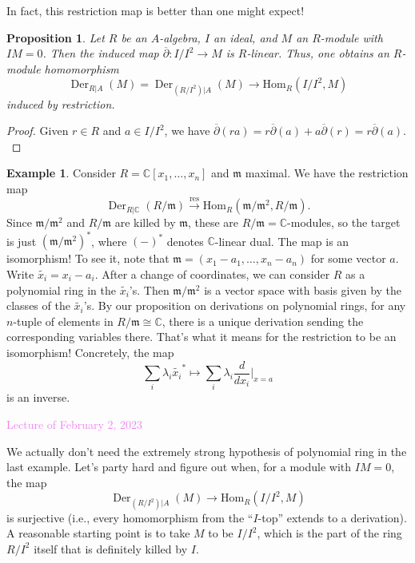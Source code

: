 \documentclass{amsart}[12pt]
\def\Der{\operatorname{Der}}
\newcommand{\Hom}{\mathrm{Hom}}
\newcommand{\Feb}[1]{\textcolor{violet}{Lecture of February #1, 2023}}
\newcommand{\C}{\mathbb{C}}
\newcommand{\fm}{{\mathfrak m}}
\numberwithin{equation}{section}
\theoremstyle{plain} %
\newtheorem{prop}[equation]{Proposition}
\theoremstyle{definition}
\newtheorem{ex}[equation]{Example}
\theoremstyle{remark}
\newcommand{\xra}[1]{\xrightarrow{#1}}
\def\res{\operatorname{res}}
\newcommand{\blue}[1]{{\color{blue}#1}}
\begin{document}
In fact, this restriction map is better than one might expect!

\blue{\begin{prop}
Let $R$ be an $A$-algebra, $I$ an ideal, and $M$ an $R$-module with $IM=0$. Then
the induced map $\overline{\partial}: I/I^2 \to M$ is $R$-linear. Thus, one obtains an $R$-module homomorphism
\[ \Der_{R|A}(M) = \Der_{(R/I^2)|A}(M) \to \Hom_R(I/I^2,M)\]
induced by restriction.
\end{prop}
\begin{proof}
Given $r\in R$ and $a\in I/I^2$, we have $\overline{\partial}(ra) = r \overline{\partial}(a) + a \overline{\partial}(r)= r \overline{\partial}(a).$
\end{proof}
}

\begin{ex} Consider $R=\C[x_1,\dots,x_n]$ and $\fm$ maximal. We have the restriction map
\[ \Der_{R|\C}(R/\fm) \xra{\res} \Hom_{R}(\fm/\fm^2,R/\fm).\]
Since $\fm/\fm^2$ and $R/\fm$ are killed by $\fm$, these are $R/\fm=\C$-modules, so the target is just $(\fm/\fm^2)^*$,
where $(-)^*$ denotes $\C$-linear dual. The map is an isomorphism! To see it, note that $\fm=(x_1-a_1,\dots,x_n-a_n)$ for some vector $a$. Write $\widetilde{x_i}=x_i-a_i$. After a change of coordinates, we can consider $R$ as a polynomial ring in the $\widetilde{x_i}$'s. Then $\fm/\fm^2$ is a vector space with basis given by the classes of the $\widetilde{x_i}$'s.  By our proposition on derivations on polynomial rings, for any $n$-tuple of elements in $R/\fm\cong \C$, there is a unique derivation sending the corresponding variables there. That's what it means for the restriction to be an isomorphism! Concretely, the map
\[ \sum_i \lambda_i \widetilde{x_i}^* \mapsto \sum_i \lambda_i \frac{d}{dx_i}|_{x=a} \]
is an inverse.
\end{ex}

\Feb{2}

We actually don't need the extremely strong hypothesis of polynomial ring in the last example. Let's party hard and figure out when, for a module with $IM=0$, the map
\[ \Der_{(R/I^2)|A}(M) \to \Hom_R(I/I^2,M)\]
is surjective (i.e., every homomorphism from the ``$I$-top'' extends to a derivation).
A reasonable starting point is to take $M$ to be $I/I^2$, which is the part of the ring $R/I^2$ itself that is definitely killed by $I$.
\end{document}
